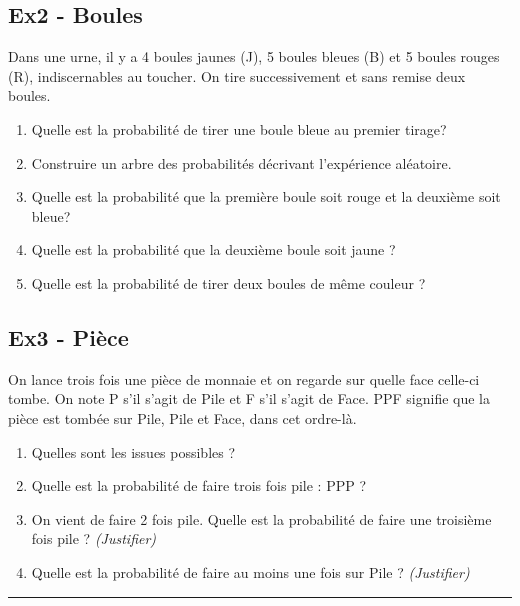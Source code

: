 \documentclass[11pt]{article}
\newcommand{\horrule}[1]{\rule{\linewidth}{#1}} %
\begin{document}
\begin{multicols}{2}
  \subsection*{Ex2 - Boules}

  Dans une urne, il y a 4 boules jaunes (J), 5 boules bleues (B) et 5 boules rouges (R), indiscernables au toucher. On tire successivement et sans remise deux boules.
  \begin{enumerate}
  \item Quelle est la probabilité de tirer une boule bleue au premier tirage?
  \item Construire un arbre des probabilités décrivant l'expérience aléatoire.
  \item Quelle est la probabilité que la première boule soit rouge et la deuxième soit bleue?
  \item Quelle est la probabilité que la deuxième boule soit jaune ?
  \item Quelle est la probabilité de tirer deux boules de même couleur ?
  \end{enumerate}

  \subsection*{Ex3 - Pièce}

  On lance trois fois une pièce de monnaie et on regarde sur quelle face celle-ci tombe. On note P s’il s’agit de Pile et F s’il s’agit de Face. 
  PPF signifie que la pièce est tombée sur Pile, Pile et Face, dans cet ordre-là.

  \begin{enumerate}
  \item Quelles sont les issues possibles ?
  \item Quelle est la probabilité de faire trois fois pile : PPP ? 
  \item On vient de faire 2 fois pile. Quelle est la probabilité de faire une troisième fois pile ? \textit{(Justifier)}
  \item Quelle est la probabilité de faire au moins une fois sur Pile ? \textit{(Justifier)}
  \end{enumerate}
\end{multicols}

\vspace{-0.4cm}
\horrule{1px}
\vspace{-0.8cm}
\end{document}
